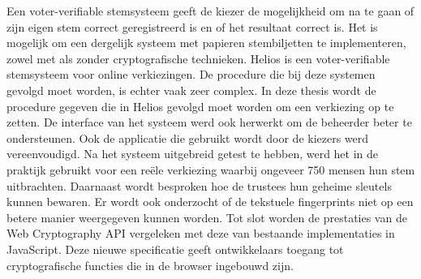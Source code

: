 %
%

Een voter-verifiable stemsysteem geeft de kiezer de mogelijkheid om na te gaan of zijn eigen stem correct geregistreerd is en of het resultaat correct is. Het is mogelijk om een dergelijk systeem met papieren stembiljetten te implementeren, zowel met als zonder cryptografische technieken. Helios is een voter-verifiable stemsysteem voor online verkiezingen. De procedure die bij deze systemen gevolgd moet worden, is echter vaak zeer complex. In deze thesis wordt de procedure gegeven die in Helios gevolgd moet worden om een verkiezing op te zetten. De interface van het systeem werd ook herwerkt om de beheerder beter te ondersteunen. Ook de applicatie die gebruikt wordt door de kiezers werd vereenvoudigd. Na het systeem uitgebreid getest te hebben, werd het in de praktijk gebruikt voor een re\"ele verkiezing waarbij ongeveer 750 mensen hun stem uitbrachten. Daarnaast wordt besproken hoe de trustees hun geheime sleutels kunnen bewaren. Er wordt ook onderzocht of de tekstuele fingerprints niet op een betere manier weergegeven kunnen worden. Tot slot worden de prestaties van de Web Cryptography API vergeleken met deze van bestaande implementaties in JavaScript. Deze nieuwe specificatie geeft ontwikkelaars toegang tot cryptografische functies die in de browser ingebouwd zijn.